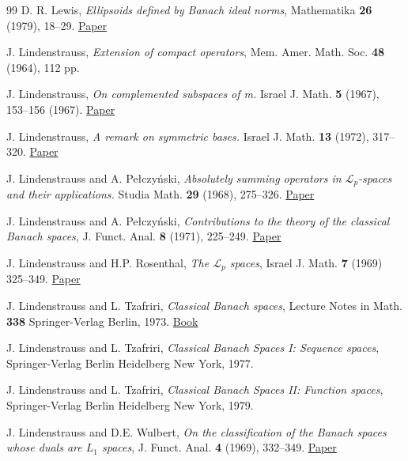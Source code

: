\documentclass[11pt]{amsart}
\theoremstyle{definition}
\numberwithin{equation}{section}
\begin{document}
\begin{thebibliography}{99}
D. R. Lewis, \textit{Ellipsoids defined by Banach ideal norms}, Mathematika \textbf{26} (1979), 18--29. \href{https://doi.org/10.1112/S0025579300009566}{Paper}

J. Lindenstrauss, \emph{Extension of compact operators}, Mem. Amer. Math. Soc. \textbf{48} (1964), 112 pp.



J. Lindenstrauss, \emph{On complemented subspaces of m.} Israel J. Math. \textbf{5} (1967), 153--156 (1967). \href{https://doi.org/10.1007/BF02771101}{Paper}


J. Lindenstrauss, \emph{A remark on symmetric bases.} Israel J. Math. \textbf{13} (1972), 317--320. \href{https://doi.org/10.1007/BF02762806}{Paper}



J. Lindenstrauss and A. Pe{\l{}}czy{\'{n}}ski, \emph{Absolutely summing operators in $\mathscr{L}_p$-spaces and their applications.} Studia Math. \textbf{29} (1968), 275--326. \href{https://eudml.org/doc/217232}{Paper}


J. Lindenstrauss and A. Pe{\l{}}czy{\'{n}}ski, \emph{Contributions to the theory of the classical Banach spaces},
J. Funct. Anal. \textbf{8} (1971), 225--249. \href{https://doi.org/10.1016/0022-1236(71)90011-5}{Paper}

J. Lindenstrauss and H.P. Rosenthal, \emph{The $\mathscr{L}_p$ spaces}, Israel J. Math. \textbf{7} (1969) 325--349. \href{https://link.springer.com/article/10.1007/BF02788865}{Paper}

J. Lindenstrauss and L. Tzafriri, \emph{Classical Banach spaces}, Lecture Notes in Math. \textbf{338}
Springer-Verlag Berlin, 1973. \href{https://link.springer.com/book/9783540064084}{Book}



J. Lindenstrauss and L. Tzafriri, \textit{Classical Banach Spaces I: Sequence spaces}, Springer-Verlag Berlin Heidelberg New York, 1977.



J. Lindenstrauss and L. Tzafriri, \textit{Classical Banach Spaces II: Function spaces}, Springer-Verlag Berlin Heidelberg New York, 1979.


J. Lindenstrauss and D.E. Wulbert, \textit{On the classification of the Banach spaces whose duals are $L_1$ spaces},
J. Funct. Anal. \textbf{4} (1969), 332--349. \href{https://doi.org/10.1016/0022-1236(69)90003-2}{Paper}



\end{thebibliography}
\end{document}
